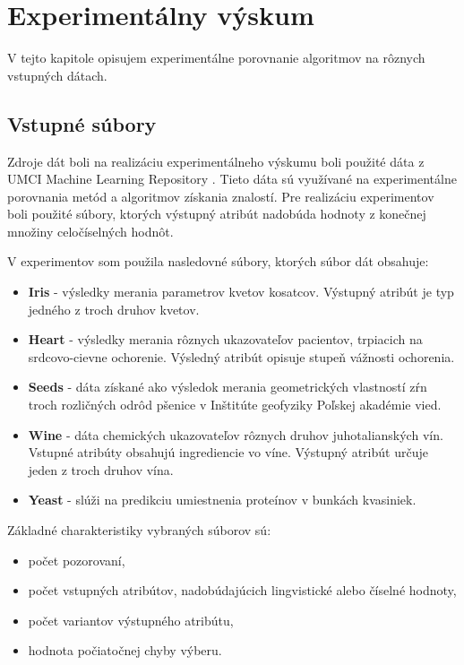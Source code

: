 \chapter{Experimentálny výskum} 

V tejto kapitole opisujem experimentálne porovnanie algoritmov na rôznych vstupných dátach. 

\section{Vstupné súbory}
Zdroje dát boli na realizáciu experimentálneho výskumu boli použité dáta z UMCI Machine Learning Repository \cite{bache2013}. 
Tieto dáta sú využívané na experimentálne porovnania metód a algoritmov získania znalostí.
Pre realizáciu experimentov boli použité súbory, ktorých výstupný atribút nadobúda hodnoty z konečnej množiny celočíselných hodnôt. 

V experimentov som použila nasledovné súbory, ktorých súbor dát obsahuje: 
\begin{itemize}
	\item \textbf{Iris}  - výsledky merania parametrov kvetov kosatcov. Výstupný atribút je typ jedného z troch druhov kvetov.  
	\item \textbf{Heart} - výsledky merania  rôznych ukazovateľov pacientov, trpiacich na srdcovo-cievne ochorenie. Výsledný atribút opisuje stupeň vážnosti ochorenia. 
	\item \textbf{Seeds} - dáta získané ako výsledok merania geometrických vlastností zŕn troch rozličných odrôd pšenice v Inštitúte geofyziky Poľskej akadémie vied. 
	
	\item \textbf{Wine} - dáta chemických ukazovateľov rôznych druhov juhotalianských vín. Vstupné atribúty obsahujú ingrediencie vo víne. Výstupný atribút určuje jeden z troch druhov vína. 
	
	\item \textbf{Yeast} - slúži na predikciu umiestnenia proteínov v bunkách kvasiniek. 

\end{itemize}


Základné charakteristiky vybraných súborov sú: 

\begin{itemize}
 \item počet pozorovaní, 
 \item počet vstupných atribútov, nadobúdajúcich lingvistické alebo číselné hodnoty, 
 \item počet variantov výstupného atribútu, 
 \item hodnota počiatočnej chyby výberu. 
\end{itemize}


